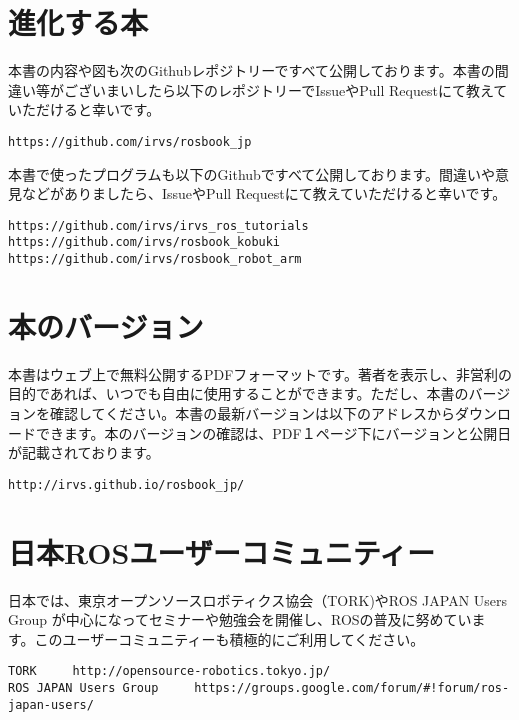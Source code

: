 \section*{進化する本}

本書の内容や図も次のGithubレポジトリーですべて公開しております。本書の間違い等がございまいしたら以下のレポジトリーでIssueやPull Requestにて教えていただけると幸いです。

\begin{lstlisting}
https://github.com/irvs/rosbook_jp
\end{lstlisting}

\noindent 本書で使ったプログラムも以下のGithubですべて公開しております。間違いや意見などがありましたら、IssueやPull Requestにて教えていただけると幸いです。

\begin{lstlisting}
https://github.com/irvs/irvs_ros_tutorials
https://github.com/irvs/rosbook_kobuki
https://github.com/irvs/rosbook_robot_arm
\end{lstlisting}

\section*{本のバージョン}

本書はウェブ上で無料公開するPDFフォーマットです。著者を表示し、非営利の目的であれば、いつでも自由に使用することができます。ただし、本書のバージョンを確認してください。本書の最新バージョンは以下のアドレスからダウンロードできます。本のバージョンの確認は、PDF１ページ下にバージョンと公開日が記載されております。

\begin{lstlisting}
http://irvs.github.io/rosbook_jp/
\end{lstlisting}

\section*{日本ROSユーザーコミュニティー}

日本では、東京オープンソースロボティクス協会（TORK)やROS JAPAN Users Group が中心になってセミナーや勉強会を開催し、ROSの普及に努めています。このユーザーコミュニティーも積極的にご利用してください。

\begin{lstlisting}
TORK     http://opensource-robotics.tokyo.jp/
ROS JAPAN Users Group     https://groups.google.com/forum/#!forum/ros-japan-users/
\end{lstlisting}

